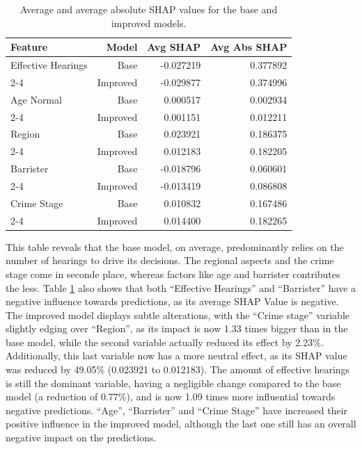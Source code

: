 \documentclass[twoside,11pt]{article}
\begin{document}
\begin{table}[h!]
\centering
\begin{tabular}{|l|r|r|r|}
\hline
\textbf{Feature} & \textbf{Model} & \textbf{Avg SHAP} & \textbf{Avg Abs SHAP} \\ \hline
Effective Hearings & Base      & -0.027219 &  0.377892 \\ \cline{2-4}
                   & Improved  & -0.029877 &  0.374996  \\ \hline
Age Normal         & Base      &  0.000517 &  0.002934 \\ \cline{2-4}
                   & Improved  & 0.001151 &  0.012211  \\ \hline
Region             & Base      &  0.023921 &  0.186375  \\ \cline{2-4}
                   & Improved  &  0.012183 &  0.182205  \\ \hline
Barrister          & Base      & -0.018796 &  0.060601  \\ \cline{2-4}
                   & Improved  & -0.013419 &  0.086808  \\ \hline
Crime Stage        & Base      &  0.010832 &  0.167486  \\ \cline{2-4}
                   & Improved  &  0.014400 &  0.182265  \\ \hline
\end{tabular}
\caption{Average and average absolute SHAP values for the base and improved models.}
\label{tab:pt_shap_stats_base_improved}
\end{table}

This table reveals that the base model, on average, predominantly relies on the number of hearings to drive its decisions. The regional aspects and the crime stage come in seconde place, whereas factors like age and barrister contributes the less. Table \ref{tab:pt_shap_stats_base_improved} also shows that both ``Effective Hearings'' and ``Barrister'' have a negative influence towards predictions, as its average SHAP Value is negative. The improved model displays subtle alterations, with the ``Crime stage'' variable slightly edging over ``Region'', as its impact is now 1.33 times bigger than in the base model, while the second variable actually reduced its effect by 2.23\%. Additionally, this last variable now has a more neutral effect, as its SHAP value was reduced by 49.05\% (0.023921 to 0.012183). The amount of effective hearings is still the dominant variable, having a negligible change compared to the base model (a reduction of 0.77\%), and is now 1.09 times more influential towards negative predictions. ``Age'', ``Barrister'' and ``Crime Stage'' have increased their positive influence in the improved model, although the last one still has an overall negative impact on the predictions.
\end{document}
